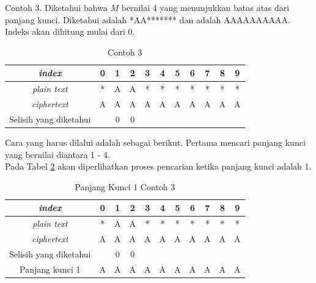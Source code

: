 		
	Contoh 3. Diketahui bahwa $M$ bernilai 4 yang menunjukkan batas atas dari panjang kunci. Diketahui \plaintext adalah *AA******* dan \ciphertext adalah AAAAAAAAAA. Indeks akan dihitung mulai dari 0. 
	 \begin{table}[H]
	 	\centering
	 	\caption{Contoh 3}
	 	\begin{tabular}{|c|c|c|c|c|c|c|c|c|c|c|}\hline
	 	\textit{index}&0&1&2&3&4&5&6&7&8&9\\ \hline
	 	\textit{plain text}&*&A&A&*&*&*&*&*&*&*\\ \hline
	 	\textit{ciphertext}&A&A&A&A&A&A&A&A&A&A\\ \hline
		Selisih yang diketahui & &0&0& & & & & & & \\ \hline	 	
	 	\end{tabular}
	 	\label{tab:contoh3}
	\end{table}
	
	Cara yang harus dilalui adalah sebagai berikut. Pertama mencari panjang kunci yang bernilai diantara 1 - 4. \\
	Pada Tabel \ref{tab:k1contoh3} akan diperlihatkan proses pencarian ketika panjang kunci adalah 1.
	\begin{table}[H]
	 	\centering
	 	\caption{Panjang Kunci 1 Contoh 3}
	 	\setlength{\arrayrulewidth}{.08em}
	 	\begin{tabular}{|c|c|c|c|c|c|c|c|c|c|c|}\hline
	 	\textit{index}&0&1&2&3&4&5&6&7&8&9\\ \hline
	 	\textit{plain text}&\cellcolor{blue!15}*&\cellcolor{yellow!25}A&\cellcolor{green!15}A&\cellcolor{lime!25}*&\cellcolor{pink!30}*&\cellcolor{red!15}*&\cellcolor{violet!30}*&\cellcolor{magenta!15}*&\cellcolor{purple!25}*&\cellcolor{teal!35}*\\ \hline
	 	\textit{ciphertext}&\cellcolor{blue!15}A&\cellcolor{yellow!25}A&\cellcolor{green!15}A&\cellcolor{lime!25}A&\cellcolor{pink!30}A&\cellcolor{red!15}A&\cellcolor{violet!30}A&\cellcolor{magenta!15}A&\cellcolor{purple!25}A&\cellcolor{teal!35}A\\ \hline
		Selisih yang diketahui & &0&0& & & & & & & \\ \hline	
		Panjang kunci 1 &A&A&A&A&A&A&A&A&A&A\\ \hline 	
	 	\end{tabular}
	 	\label{tab:k1contoh3}
	\end{table}
	
